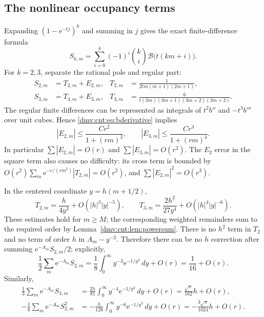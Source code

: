 \documentclass[11pt,letterpaper]{article}
\numberwithin{equation}{section}
\theoremstyle{definition}\newtheorem{definition}[theorem]{Definition}
\theoremstyle{remark}\newtheorem{remark}[theorem]{Remark}
\newcommand{\ee}{\mathrm e}
\begin{document}
\subsection{The nonlinear occupancy terms}
Expanding $(1-\ee^{-tj})^k$ and summing in $j$ gives the exact finite-difference formula
\begin{equation}\label{dmv:cnt:eq:finite-difference}
S_{k,m}=\sum_{i=0}^k(-1)^i\binom ki\mathcal B\bigl(t(km+i)\bigr).
\end{equation}
For $k=2,3$, separate the rational pole and regular part:
\begin{align}\label{dmv:cnt:eq:T2T3}
S_{2,m}&=T_{2,m}+E_{2,m},&
T_{2,m}&=\frac1{2tm(m+1)(2m+1)},\\
S_{3,m}&=T_{3,m}+E_{3,m},&
T_{3,m}&=\frac6{t(3m)(3m+1)(3m+2)(3m+3)}.\nonumber
\end{align}
The regular finite differences can be represented as integrals of $t^2b''$ and $-t^3b'''$ over unit cubes. Hence \eqref{dmv:cnt:eq:bderivative} implies
\begin{equation}\label{dmv:cnt:eq:Ebounds}
|E_{2,m}|\le\frac{Cr^2}{1+(rm)^3},\qquad
|E_{3,m}|\le\frac{Cr^3}{1+(rm)^4}.
\end{equation}
In particular $\sum|E_{2,m}|=O(r)$ and $\sum|E_{3,m}|=O(r^2)$. The $E_2$ error in the square term also causes no difficulty: its cross term is bounded by
$O(r^2)\sum_m\ee^{-c/(rm^2)}|T_{2,m}|=O(r^2)$, and $\sum|E_{2,m}|^2=O(r^3)$.

In the centered coordinate $y=h(m+1/2)$,
\begin{equation}\label{dmv:cnt:eq:center-T}
T_{2,m}=\frac{h}{4y^3}+O(|h|^3|y|^{-5}),\qquad
T_{3,m}=\frac{2h^2}{27y^4}+O(|h|^4|y|^{-6}).
\end{equation}
These estimates hold for $m\ge M$; the corresponding weighted remainders sum to the required order by Lemma~\ref{dmv:cnt:lem:powersum}. There is no $h^2$ term in $T_2$ and no term of order $h$ in $A_m-y^{-2}$. Therefore there can be no $h$ correction after summing $\ee^{-A_m}S_{2,m}/2$; explicitly,
\begin{equation}\label{dmv:cnt:eq:S2result}
\frac12\sum_m\ee^{-A_m}S_{2,m}
=\frac18\int_0^\infty y^{-3}\ee^{-1/y^2}\,dy+O(r)
=\frac1{16}+O(r).
\end{equation}
Similarly,
\begin{align}\label{dmv:cnt:eq:S3square}
\frac13\sum_m\ee^{-A_m}S_{3,m}
&=\frac{2h}{81}\int_0^\infty y^{-4}\ee^{-1/y^2}\,dy+O(r)
=\frac{\sqrt\pi}{162}h+O(r),\\
-\frac18\sum_m\ee^{-A_m}S_{2,m}^2
&=-\frac h{128}\int_0^\infty y^{-6}\ee^{-1/y^2}\,dy+O(r)
=-\frac{3\sqrt\pi}{1024}h+O(r).\nonumber
\end{align}
\end{document}

